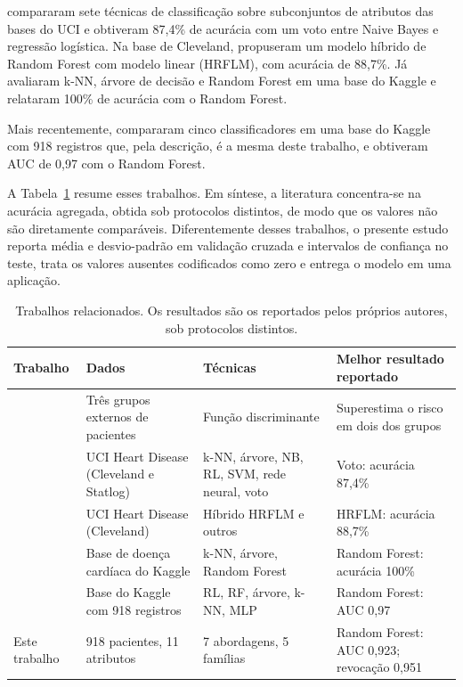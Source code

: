 \documentclass[12pt]{article}
\begin{document}
\cite{amin:19} compararam sete técnicas de classificação sobre subconjuntos
de atributos das bases do UCI e obtiveram 87,4\% de acurácia com um voto
entre Naive Bayes e regressão logística. Na base de Cleveland,
\cite{mohan:19} propuseram um modelo híbrido de Random Forest com modelo
linear (HRFLM), com acurácia de 88,7\%. Já \cite{ali:21} avaliaram k-NN,
árvore de decisão e Random Forest em uma base do Kaggle e relataram 100\% de
acurácia com o Random Forest.

Mais recentemente, \cite{chulde:25} compararam cinco classificadores em uma
base do Kaggle com 918 registros que, pela descrição, é a mesma deste
trabalho, e obtiveram AUC de 0,97 com o Random Forest.

A Tabela~\ref{tab:relacionados} resume esses trabalhos. Em síntese, a
literatura concentra-se na acurácia agregada, obtida sob protocolos distintos,
de modo que os valores não são diretamente comparáveis. Diferentemente desses
trabalhos, o presente estudo reporta média e desvio-padrão em validação
cruzada e intervalos de confiança no teste, trata os valores ausentes
codificados como zero e entrega o modelo em uma aplicação.

\begin{table}[!htb]
\centering
\caption{Trabalhos relacionados. Os resultados são os reportados pelos próprios
autores, sob protocolos distintos.}
\label{tab:relacionados}
\footnotesize
\begin{tabular}{@{}p{4.45cm}p{2.75cm}p{3.1cm}p{3.0cm}@{}}
\toprule
Trabalho & Dados & Técnicas & Melhor resultado reportado \\
\midrule
\cite{detrano:89} & Três grupos externos de pacientes & Função discriminante & Superestima o risco em dois dos grupos \\
\cite{amin:19} & UCI Heart Disease (Cleveland e Statlog) & k-NN, árvore, NB, RL, SVM, rede neural, voto & Voto: acurácia 87,4\% \\
\cite{mohan:19} & UCI Heart Disease (Cleveland) & Híbrido HRFLM e outros & HRFLM: acurácia 88,7\% \\
\cite{ali:21} & Base de doença cardíaca do Kaggle & k-NN, árvore, Random Forest & Random Forest: acurácia 100\% \\
\cite{chulde:25} & Base do Kaggle com 918 registros & RL, RF, árvore, k-NN, MLP & Random Forest: AUC 0,97 \\
\midrule
Este trabalho & 918 pacientes, 11 atributos & 7 abordagens, 5 famílias & Random Forest: AUC 0,923; revocação 0,951 \\
\bottomrule
\end{tabular}
\end{table}
\end{document}
